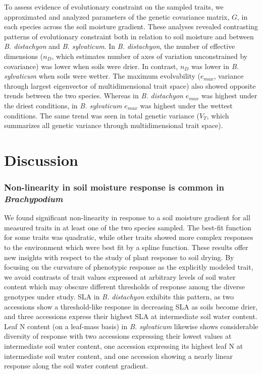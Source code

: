 \documentclass[jou,floatsintext]{apa6}
\begin{document}
To assess evidence of evolutionary constraint on the sampled traits, we approximated and analyzed parameters of the genetic covariance matrix, \(G\), in each species across the soil moisture gradient. These analyses revealed contrasting patterns of evolutionary constraint both in relation to soil moisture and between \emph{B. distachyon} and \emph{B. sylvaticum}. In \emph{B. distachyon}, the number of effective dimensions (\(n_D\), which estimates number of axes of variation unconstrained by covariance) was lower when soils were drier. In contrast, \(n_D\) was lower in \emph{B. sylvaticum} when soils were wetter. The maximum evolvability (\(e_{max}\), variance through largest eigenvector of multidimensional trait space) also showed opposite trends between the two species. Whereas in \emph{B. distachyon} \(e_{max}\) was highest under the driest conditions, in \emph{B. sylvaticum} \(e_{max}\) was highest under the wettest conditions. The same trend was seen in total genetic variance (\(V_T\), which summarizes all genetic variance through multidimensional trait space).

\hypertarget{discussion}{%
\section{Discussion}\label{discussion}}

\hypertarget{non-linearity-in-soil-moisture-response-is-common-in-brachypodium}{%
\subsubsection{\texorpdfstring{Non-linearity in soil moisture response is common in \emph{Brachypodium}}{Non-linearity in soil moisture response is common in Brachypodium}}\label{non-linearity-in-soil-moisture-response-is-common-in-brachypodium}}

We found significant non-linearity in response to a soil moisture gradient for all measured traits in at least one of the two species sampled. The best-fit function for some traits was quadratic, while other traits showed more complex responses to the environment which were best fit by a spline function. These results offer new insights with respect to the study of plant response to soil drying. By focusing on the curvature of phenotypic response as the explicitly modeled trait, we avoid contrasts of trait values expressed at arbitrary levels of soil water content which may obscure different thresholds of response among the diverse genotypes under study. SLA in \emph{B. distachyon} exhibits this pattern, as two accessions show a threshold-like response in decreasing SLA as soils become drier, and three accessions express their highest SLA at intermediate soil water content. Leaf N content (on a leaf-mass basis) in \emph{B. sylvaticum} likewise shows considerable diversity of response with two accessions expressing their lowest values at intermediate soil water content, one accession expressing its highest leaf N at intermediate soil water content, and one accession showing a nearly linear response along the soil water content gradient.
\end{document}
